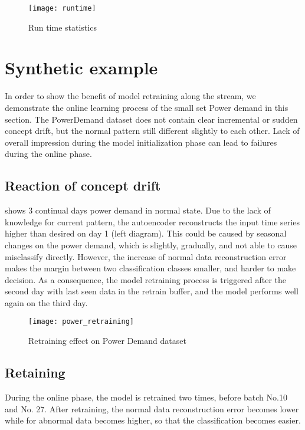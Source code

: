 \begin{figure}[h]
\centering
\texttt{[image: runtime]}
\caption[Run time statistics]{Run time statistics}
\label{fig:runtime}
\end{figure}


\section{Synthetic example}
\label{sec:synthetic}

In order to show the benefit of model retraining along the stream, we demonstrate the online learning process of the small set Power demand in this section. The PowerDemand dataset does not contain clear incremental or sudden concept drift, but the normal pattern still different slightly to each other. Lack of overall impression during the model initialization phase can lead to failures during the online phase. 

\subsection{Reaction of concept drift}
\label{sec:reaction}

 shows 3 continual days power demand in normal state. Due to the lack of knowledge for current pattern, the autoencoder reconstructs the input time series higher than desired on day 1 (left diagram). This could be caused by seasonal changes on the power demand, which is slightly, gradually, and not able to cause misclassify directly. However, the increase of normal data reconstruction error makes the margin between two classification classes smaller, and harder to make decision. As a consequence, the model retraining process is triggered after the second day with last seen data in the retrain buffer, and the model performs well again on the third day.

\begin{figure}[h]
\centering
\texttt{[image: power\_retraining]}
\caption[Retraining effect on Power Demand dataset]{Retraining effect on Power Demand dataset}
\label{fig:power_retraining}
\end{figure}

\subsection{Retaining}
\label{sec:retrainig}

During the online phase, the model is retrained two times, before batch No.10 and No. 27. After retraining, the normal data reconstruction error becomes lower while for abnormal data becomes higher, so that the classification becomes easier.

